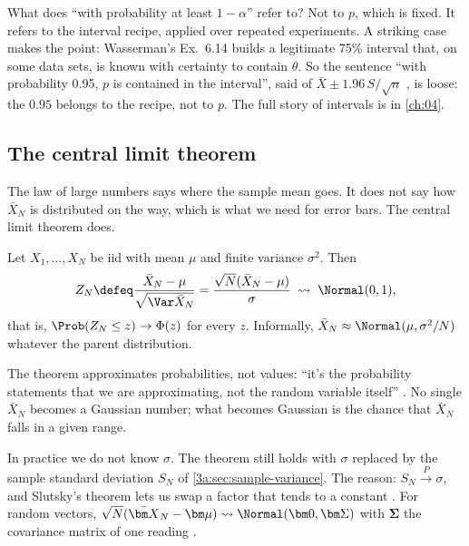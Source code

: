 What does ``with probability at least $1-\alpha$'' refer to? Not to $p$,
which is fixed. It refers to the interval recipe, applied over repeated
experiments. A striking case makes the point: Wasserman's Ex.~6.14 builds a
legitimate 75\% interval that, on some data sets, is known with certainty to
contain $\theta$. So the sentence ``with probability 0.95, $p$ is contained
in the interval'', said of $\bar X\pm1.96\,S/\sqrt n$
, is loose: the $0.95$ belongs to the recipe,
not to $p$. The full story of intervals is in \cref{ch:04}.

\subsection{The central limit theorem}
\label{3a:sec:clt}

The law of large numbers says where the sample mean goes. It does not say
how $\bar X_N$ is distributed on the way, which is what we need for error
bars. The central limit theorem does.

\begin{keyidea}
Let $X_1,\dots,X_N$ be iid with mean $\mu$ and finite variance $\sigma^2$.
Then
\begin{equation}
  Z_N\defeq\frac{\bar X_N-\mu}{\sqrt{\Var\bar X_N}}=\frac{\sqrt N(\bar X_N-\mu)}{\sigma}
  \;\rightsquigarrow\;\Normal(0,1),
  \label{3a:eq:clt}
\end{equation}
that is, $\Prob(Z_N\le z)\to\Phi(z)$ for every $z$. Informally,
$\bar X_N\approx\Normal(\mu,\sigma^2/N)$ whatever the parent distribution.
\end{keyidea}

The theorem approximates probabilities, not values: ``it's the probability
statements that we are approximating, not the random variable itself''
. No single $\bar X_N$ becomes a Gaussian number; what becomes
Gaussian is the chance that $\bar X_N$ falls in a given range.

In practice we do not know $\sigma$. The theorem still holds with $\sigma$
replaced by the sample standard deviation $S_N$ of
\cref{3a:sec:sample-variance}. The reason: $S_N\xrightarrow{P}\sigma$, and
Slutsky's theorem lets us swap a factor that tends to a constant
. For random vectors,
$\sqrt N(\bar{\bm X}_N-\bm\mu)\rightsquigarrow\Normal(\bm 0,\bm\Sigma)$ with
$\bm\Sigma$ the covariance matrix of one reading .

